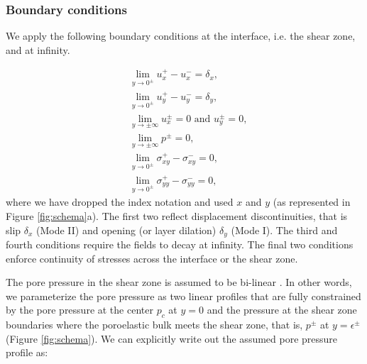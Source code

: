 \documentclass[draft]{agujournal2019}
\begin{document}
\subsubsection{Boundary conditions} \label{sec:bc}

We apply the following boundary conditions at the interface, i.e. the shear zone, and at infinity.

\begin{align}
& \lim_{y \rightarrow 0^\pm} u^+_x - u^-_x = \delta_x, \\
& \lim_{y \rightarrow 0^\pm} u^+_y - u^-_y = \delta_y, \\
& \lim_{y \rightarrow \pm \infty} u^\pm_x = 0 \text{ and } u^\pm_y = 0 , \\
& \lim_{y \rightarrow \pm \infty} p^\pm = 0, \\
& \lim_{y \rightarrow 0^\pm} \sigma^+_{xy} - \sigma^-_{xy} = 0, \\
& \lim_{y \rightarrow 0^\pm} \sigma^+_{yy} - \sigma^-_{yy} = 0,
\end{align}
where we have dropped the index notation and used $x$ and $y$ (as represented in Figure \ref{fig:schema}a). The first two reflect displacement discontinuities, that is slip $\delta_x$ (Mode II) and opening (or layer dilation) $\delta_y$ (Mode I). The third and fourth conditions require the fields to decay at infinity. The final two conditions enforce continuity of stresses across the interface or the shear zone.  

The pore pressure in the shear zone is assumed to be bi-linear  \cite{Heimisson2021}. In other words, we parameterize the pore pressure as two linear profiles that are fully constrained by the pore pressure at the center $p_c$ at $y=0$ and the pressure at the shear zone boundaries where the poroelastic bulk meets the shear zone, that is, $p^\pm$ at $y = \epsilon^\pm$ (Figure \ref{fig:schema}). We can explicitly write out the assumed pore pressure profile as:
\end{document}
